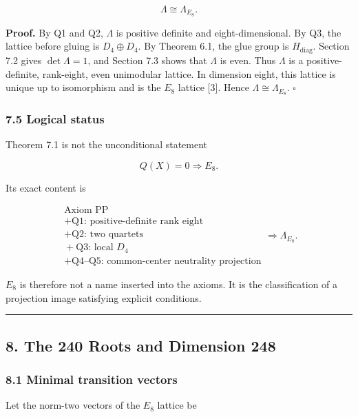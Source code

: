 \documentclass[
  a4paper,
]{article}
\begin{document}
\[
\boxed{
\Lambda
\cong
\Lambda_{E_8}.
}
\]

\textbf{Proof.} By Q1 and Q2, \(\Lambda\) is positive definite and
eight-dimensional. By Q3, the lattice before gluing is
\(D_4\oplus D_4\). By Theorem 6.1, the glue group is
\(H_{\mathrm{diag}}\). Section 7.2 gives \(\det\Lambda=1\), and Section
7.3 shows that \(\Lambda\) is even. Thus \(\Lambda\) is a
positive-definite, rank-eight, even unimodular lattice. In dimension
eight, this lattice is unique up to isomorphism and is the \(E_8\)
lattice {[}3{]}. Hence \(\Lambda\cong\Lambda_{E_8}\). \(\square\)

\subsubsection{7.5 Logical status}\label{logical-status}

Theorem 7.1 is not the unconditional statement

\[
Q(X)=0
\Longrightarrow
E_8.
\]

Its exact content is

\[
\boxed{
\begin{array}{c}
\text{Axiom PP}\\
{}+\text{Q1: positive-definite rank eight}\\
{}+\text{Q2: two quartets}\\
{}+\text{Q3: local }D_4\\
{}+\text{Q4--Q5: common-center neutrality projection}
\end{array}
\Longrightarrow
\Lambda_{E_8}.
}
\]

\(E_8\) is therefore not a name inserted into the axioms. It is the
classification of a projection image satisfying explicit conditions.

\begin{center}\rule{0.5\linewidth}{0.5pt}\end{center}

\subsection{8. The 240 Roots and Dimension
248}\label{the-240-roots-and-dimension-248}

\subsubsection{8.1 Minimal transition
vectors}\label{minimal-transition-vectors}

Let the norm-two vectors of the \(E_8\) lattice be
\end{document}
